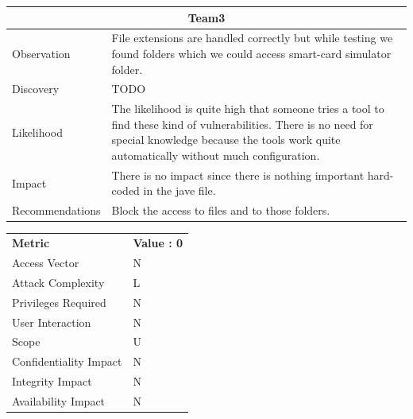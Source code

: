 \documentclass[headsepline,footsepline,footinclude=false,oneside,fontsize=11pt,paper=a4,listof=totoc,bibliography=totoc]{scrbook} %
\begin{document}
\begin{tabular}{ l|p{11cm}  }
	\hline
	\multicolumn{2}{c}{\textbf{Team3}} \\
	\hline
	Observation   & File extensions are handled correctly but while testing we found folders which we could access smart-card simulator folder.   \\
	Discovery  & TODO \\
	Likelihood & The likelihood is quite high that someone tries a tool to find these kind of vulnerabilities. There is no need for special knowledge because the tools work quite automatically without much configuration. \\
	Impact    & There is no impact since there is nothing important hard-coded in the jave file.\\
	Recommendations & Block the access to files and to those folders.\\ 
	\hline
\end{tabular}

\begin{center}
	\begin{tabular}{ll}
		\rowcolor[HTML]{34CDF9}
		{\color[HTML]{ECF4FF} \textbf{Metric}}        & {\color[HTML]{ECF4FF} \textbf{Value : 0}} \\
		\rowcolor[HTML]{BBDAFF}
		{\color[HTML]{333333} Access Vector}          & {\color[HTML]{333333} } N              \\
		\rowcolor[HTML]{ECF4FF}
		{\color[HTML]{333333} Attack Complexity}      & {\color[HTML]{333333} } L              \\
		\rowcolor[HTML]{BBDAFF}
		{\color[HTML]{333333} Privileges Required}    & {\color[HTML]{333333} } N              \\
		\rowcolor[HTML]{ECF4FF}
		{\color[HTML]{333333} User Interaction}       & {\color[HTML]{333333} } N              \\
		\rowcolor[HTML]{BBDAFF}
		{\color[HTML]{333333} Scope}                  & {\color[HTML]{333333} } U              \\
		\rowcolor[HTML]{ECF4FF}
		{\color[HTML]{333333} Confidentiality Impact} & {\color[HTML]{333333} } N              \\
		\rowcolor[HTML]{BBDAFF}
		{\color[HTML]{333333} Integrity Impact}       & {\color[HTML]{333333} } N              \\
		\rowcolor[HTML]{ECF4FF}
		{\color[HTML]{333333} Availability Impact}    & {\color[HTML]{333333} } N
	\end{tabular}
\end{center}
\pagebreak
\end{document}
